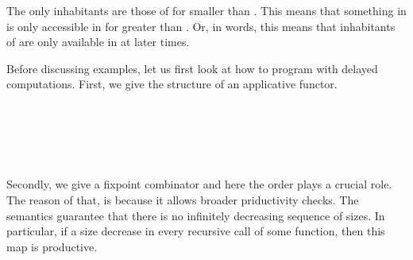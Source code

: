 The only inhabitants    are those of   for  smaller than .
This means that something in   is only accessible in    for  greater than .
Or, in words, this means that inhabitants of  are only available in   at later times.

Before discussing examples, let us first look at how to program with delayed computations.
First, we give  the structure of an applicative functor.

\begin{code}%
\>[0]\AgdaSpace{}%
\AgdaSymbol{:}\AgdaSpace{}%
\AgdaSymbol{\{}\AgdaSpace{}%
\AgdaSymbol{:}\AgdaSpace{}%
\AgdaSymbol{\}}\AgdaSpace{}%
\AgdaSpace{}%
\AgdaSpace{}%
\AgdaSpace{}%
\AgdaSpace{}%
\AgdaSymbol{(}\AgdaSpace{}%
\AgdaSymbol{)}\<%
\\
\>[0]\AgdaSpace{}%
\AgdaSymbol{(}\AgdaSpace{}%
\AgdaSymbol{)}\AgdaSpace{}%
\AgdaSpace{}%
\AgdaSymbol{=}\AgdaSpace{}%
\<%
\\
%
\\[\AgdaEmptyExtraSkip]%
\>[0]\AgdaSpace{}%
\AgdaSymbol{:}\AgdaSpace{}%
\AgdaSymbol{\{}\AgdaSpace{}%
\AgdaSpace{}%
\AgdaSymbol{:}\AgdaSpace{}%
\AgdaSymbol{\}}\AgdaSpace{}%
\AgdaSpace{}%
\AgdaSymbol{(}\AgdaSymbol{(}\AgdaSpace{}%
\AgdaSpace{}%
\AgdaSymbol{)}\AgdaSpace{}%
\AgdaSpace{}%
\AgdaSpace{}%
\AgdaSpace{}%
\AgdaSpace{}%
\AgdaSpace{}%
\AgdaSymbol{)}\<%
\\
\>[0]\AgdaSpace{}%
\AgdaSymbol{(}\AgdaSpace{}%
\AgdaSpace{}%
\AgdaSymbol{)}\AgdaSpace{}%
\AgdaSpace{}%
\AgdaSymbol{=}\AgdaSpace{}%
\AgdaSpace{}%
\AgdaSpace{}%
\AgdaSpace{}%
\AgdaSymbol{(}\AgdaSpace{}%
\AgdaSpace{}%
\AgdaSymbol{)}\<%
\end{code}

Secondly, we give a fixpoint combinator and here the order plays a crucial role.
The reason of that, is because it allows broader priductivity checks.
The semantics guarantee that there is no infinitely decreasing sequence of sizes.
In particular, if a size decrease in every recursive call of some function, then this map is productive.

